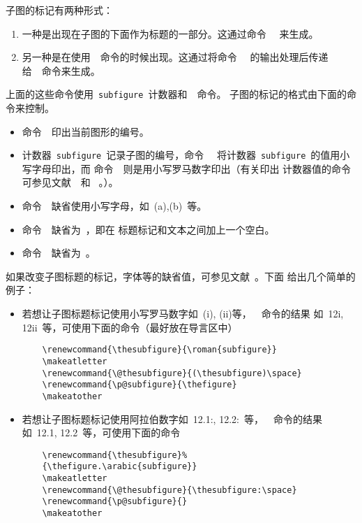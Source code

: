 子图的标记有两种形式：
\begin{enumerate}
	\item 一种是出现在子图的下面作为标题的一部分。这通过命令~~
	来生成。
	\item 另一种是在使用~~命令的时候出现。这通过将命令~~
	的输出处理后传递给~~命令来生成。
\end{enumerate}

上面的这些命令使用~\texttt{subfigure}~计数器和~~命令。
子图的标记的格式由下面的命令来控制。
\begin{itemize}
	\item 命令~~印出当前图形的编号。
	\item 计数器~\texttt{subfigure}~记录子图的编号，命令~~
	将计数器~\texttt{subfigure}~的值用小写字母印出，而
	命令~~则是用小写罗马数字印出（有关印出
	计数器值的命令可参见文献~\cite[第~98~页]{Leslie}~和
	~\cite[第~446~页]{Michel}。）。
	\item 命令~~缺省使用小写字母，如~(a),(b)~等。
	\item 命令~~缺省为~，即在
	标题标记和文本之间加上一个空白。
	\item 命令~~缺省为~。
\end{itemize}

如果改变子图标题的标记，字体等的缺省值，可参见文献~\cite{subfigure}。下面
给出几个简单的例子：
\begin{itemize}
	\item 若想让子图标题标记使用小写罗马数字如~(i), (ii)等，~~命令的结果
	如~12i, 12ii~等，可使用下面的命令（最好放在导言区中）
	\begin{Verbatim}
	\renewcommand{\thesubfigure}{\roman{subfigure}} 
	\makeatletter 
	\renewcommand{\@thesubfigure}{(\thesubfigure)\space} 
	\renewcommand{\p@subfigure}{\thefigure} 
	\makeatother
	\end{Verbatim}
	\item 若想让子图标题标记使用阿拉伯数字如~12.1:, 12.2:~等，~~命令的结果
	如~12.1, 12.2~等，可使用下面的命令
	\begin{Verbatim}
	\renewcommand{\thesubfigure}%
	{\thefigure.\arabic{subfigure}} 
	\makeatletter 
	\renewcommand{\@thesubfigure}{\thesubfigure:\space} 
	\renewcommand{\p@subfigure}{} 
	\makeatother
	\end{Verbatim}
\end{itemize}

